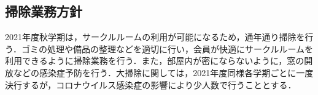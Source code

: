 \subsection*{掃除業務方針}


2021年度秋学期は，サークルルームの利用が可能になるため，通年通り掃除を行う．ゴミの処理や備品の整理などを適切に行い，会員が快適にサークルルームを利用できるように掃除業務を行う．また，部屋内が密にならないように，窓の開放などの感染症予防を行う．大掃除に関しては，2021年度同様各学期ごとに一度決行するが，コロナウイルス感染症の影響により少人数で行うこととする．
